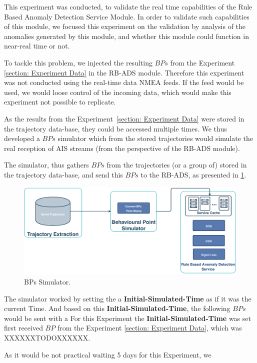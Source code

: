 This experiment was conducted, to validate the real time capabilities of the Rule Based Anomaly Detection Service Module. In order to validate such capabilities of this module, we focused this experiment on the validation by analysis of the anomalies generated by this module, and whether this module could function in near-real time or not.

To tackle this problem, we injected the resulting $BPs$ from the Experiment \ref{section: Experiment Data} in the RB-ADS module. Therefore this experiment was not conducted using the real-time data NMEA feeds. If the feed would be used,  we would loose control of the incoming data, which would make this experiment not possible to replicate.

As the results from the Experiment~\ref{section: Experiment Data} were stored in the trajectory data-base, they could be accessed multiple times. We thus developed a $BPs$ simulator which from the stored trajectories would simulate the real reception of AIS streams (from the perspective of the RB-ADS module).

The simulator, thus gathers $BPs$ from the trajectories (or a group of) stored in the trajectory data-base, and send this $BPs$ to the RB-ADS, as presented in \ref{fig: 5 BPs Simulator}.

\begin{figure}[H]
	\centering
	\includegraphics[scale = .3]{figures/Ch5/SRM-Exp-Simulator.pdf}
    \caption{BPs Simulator.}
    \label{fig: 5 BPs Simulator}
\end{figure}

The simulator worked by setting the a \textbf{Initial-Simulated-Time} as if it was the current Time. And based on this \textbf{Initial-Simulated-Time}, the following $BPs$ would be sent with a 
For this Experiment the \textbf{Initial-Simulated-Time} was set first received $BP$ from the Experiment \ref{section: Experiment Data}, which was XXXXXXTODOXXXXXX.  

As it would be not practical waiting 5 days for this Experiment, we 

